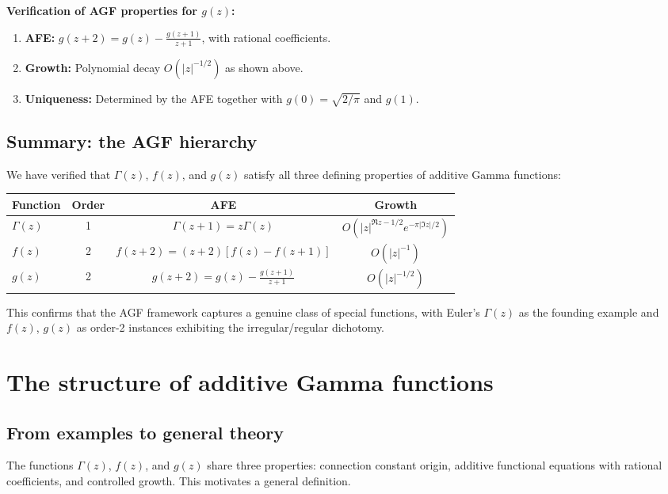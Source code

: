 \documentclass[11pt,reqno]{amsart}
\theoremstyle{definition}
\numberwithin{equation}{section}
\begin{document}
\textbf{Verification of AGF properties for $g(z)$:}
\begin{enumerate}[label=(\roman*)]
\item \textbf{AFE:} $g(z+2) = g(z) - \frac{g(z+1)}{z+1}$, with rational coefficients.
\item \textbf{Growth:} Polynomial decay $O(|z|^{-1/2})$ as shown above.
\item \textbf{Uniqueness:} Determined by the AFE together with $g(0) = \sqrt{2/\pi}$ and $g(1)$.
\end{enumerate}

\subsection{Summary: the AGF hierarchy}

We have verified that $\Gamma(z)$, $f(z)$, and $g(z)$ satisfy all three defining properties of additive Gamma functions:

\begin{center}
\begin{tabular}{lccc}
\hline
Function & Order & AFE & Growth \\
\hline
$\Gamma(z)$ & 1 & $\Gamma(z+1) = z\Gamma(z)$ & $O(|z|^{\Re z - 1/2}e^{-\pi|\Im z|/2})$ \\
$f(z)$ & 2 & $f(z+2) = (z+2)[f(z) - f(z+1)]$ & $O(|z|^{-1})$ \\
$g(z)$ & 2 & $g(z+2) = g(z) - \frac{g(z+1)}{z+1}$ & $O(|z|^{-1/2})$ \\
\hline
\end{tabular}
\end{center}

This confirms that the AGF framework captures a genuine class of special functions, with Euler's $\Gamma(z)$ as the founding example and $f(z)$, $g(z)$ as order-2 instances exhibiting the irregular/regular dichotomy.

\section{The structure of additive Gamma functions}\label{sec:general-theory}

\subsection{From examples to general theory}

The functions $\Gamma(z)$, $f(z)$, and $g(z)$ share three properties: connection constant origin, additive functional equations with rational coefficients, and controlled growth. This motivates a general definition.
\end{document}
